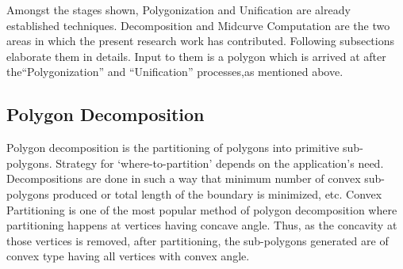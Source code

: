 Amongst the stages shown, Polygonization and Unification are already established techniques. Decomposition and Midcurve Computation are the two areas in which the present research work has contributed. Following subsections elaborate them in details. Input to them is a polygon which is arrived at after the``Polygonization'' and ``Unification'' processes,as  mentioned above. %

%


\subsection{Polygon Decomposition}

Polygon decomposition is the partitioning of polygons into primitive sub-polygons. 
Strategy for `where-to-partition' depends on the application's need. Decompositions are done in such a way that minimum number of convex sub-polygons produced or total length of the boundary is minimized, etc. Convex Partitioning is one of the most popular method of polygon decomposition where partitioning happens at vertices having concave angle. Thus, as the concavity at those vertices is removed, after partitioning, the sub-polygons generated are of convex type having all vertices with convex angle. 

